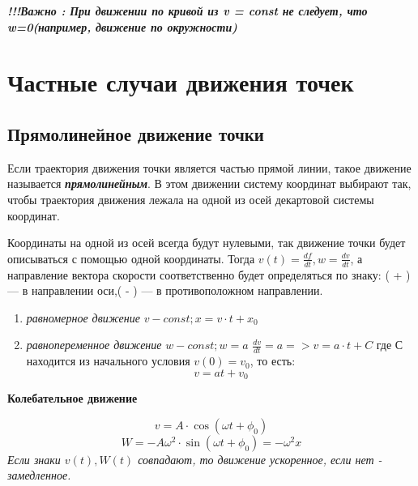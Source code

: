 \textbf{\textit{!!!Важно : При движении по кривой из v = const не следует, что w=0(например, движение по окружности)}} %

\section{Частные случаи движения точек}
\subsection{Прямолинейное движение точки}
  Если траектория движения точки является частью прямой линии, такое движение называется \textbf{\textit{прямолинейным}}. В этом движении систему координат выбирают так, чтобы траектория движения лежала на одной из осей декартовой системы координат.

\vspace{5px}

Координаты на одной из осей всегда будут нулевыми, так движение точки будет описываться с помощью одной координаты. Тогда $ v(t) = \frac{df}{dt}, w =\frac{dv}{dt}$,  а направление вектора скорости соответственно будет определяться по знаку: ( + ) --- в направлении оси,( - ) --- в противоположном направлении.
\begin{enumerate}
    \item \textit{равномерное движение} $v - const; x = v \cdot t + x_0 $
    \item \textit{равнопеременное движение} $w - const; w = a$
          $\frac{dv}{dt} = a => v = a \cdot t + C $ где С находится из начального условия $v(0) = v_0$, то есть:
          \[ v = at+v_0\]
\end{enumerate}

\vspace{10px}

\textbf{Колебательное движение}

\[ v = A \cdot \cos{(\omega t+ \phi_0)}\]
\[ W = -A\omega ^2 \cdot \sin{(\omega t+\phi_0)} = -\omega^2x \]
\textit{Если знаки $v(t) , W(t)$ совпадают, то движение ускоренное, если нет - замедленное.}
